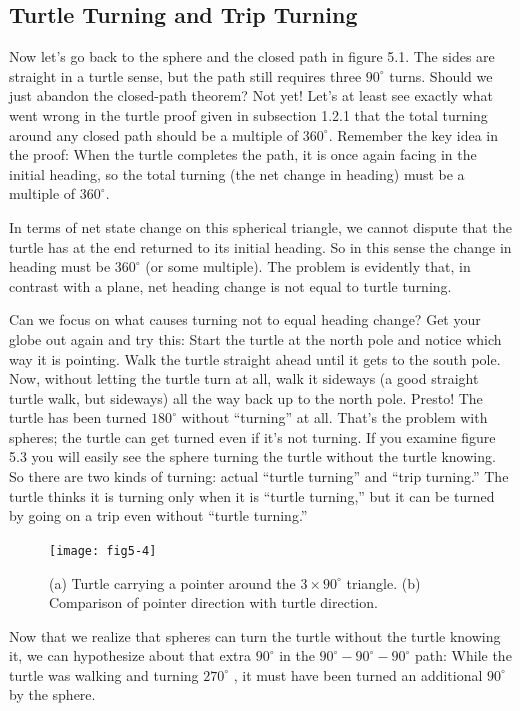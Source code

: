 \documentclass{book}
\begin{document}
\subsection{Turtle Turning and Trip Turning}

Now let's go back to the sphere and the closed path in figure 5.1. The
sides are straight in a turtle sense, but the path still requires three
$90^{\circ}$ turns. Should we just abandon the closed-path theorem? Not yet!
Let's at least see exactly what went wrong in the turtle proof given in
subsection 1.2.1 that the total turning around any closed path should
be a multiple of $360^{\circ}$. Remember the key idea in the proof: When the
turtle completes the path, it is once again facing in the initial heading,
so the total turning (the net change in heading) must be a multiple of
$360^{\circ}$.

In terms of net state change on this spherical triangle, we cannot
dispute that the turtle has at the end returned to its initial heading. So
in this sense the change in heading must be $360^{\circ}$ (or some multiple). The
problem is evidently that, in contrast with a plane, net heading change
is not equal to turtle turning.

Can we focus on what causes turning not to equal heading change?
Get your globe out again and try this: Start the turtle at the north pole
and notice which way it is pointing. Walk the turtle straight ahead until
it gets to the south pole. Now, without letting the turtle turn at all,
walk it sideways (a good straight turtle walk, but sideways) all the way
back up to the north pole. Presto! The turtle has been turned $180^{\circ}$
without ``turning'' at all. That's the problem with spheres; the turtle
can get turned even if it's not turning. If you examine figure 5.3 you
will easily see the sphere turning the turtle without the turtle knowing.
So there are two kinds of turning: actual ``turtle turning'' and ``trip
turning.'' The turtle thinks it is turning only when it is ``turtle turning,''
but it can be turned by going on a trip even without ``turtle turning.''

\begin{figure}
\begin{center}
\texttt{[image: fig5-4]}
\caption{(a) Turtle carrying a pointer around the $3 \times 90^{\circ}$ triangle. (b) Comparison of pointer direction with turtle direction.}
\end{center}
\end{figure}

Now that we realize that spheres can turn the turtle without the turtle
knowing it, we can hypothesize about that extra $90^{\circ}$ in the $90^{\circ}-90^{\circ}-90^{\circ}$
path: While the turtle was walking and turning $270^{\circ}$ , it must have been
turned an additional $90^{\circ}$ by the sphere.
\end{document}
